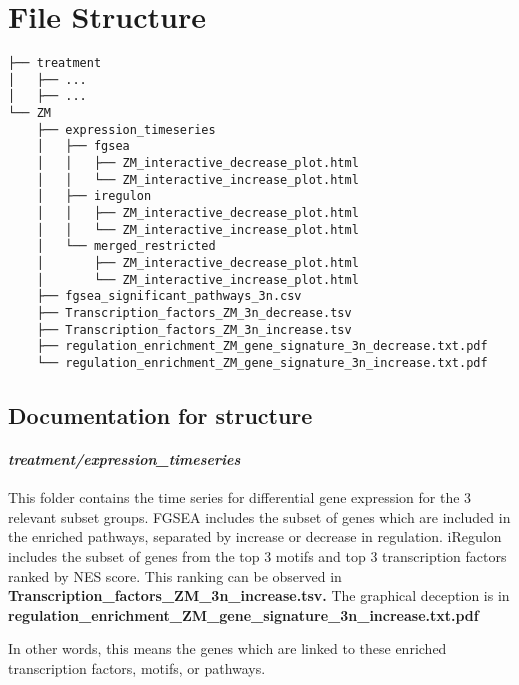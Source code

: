 \documentclass[
]{article}
\author{}
\date{\vspace{-2.5em}}
\begin{document}
\hypertarget{file-structure}{%
\section{File Structure}\label{file-structure}}

\begin{verbatim}
├── treatment
│   ├── ... 
│   ├── ... 
└── ZM
    ├── expression_timeseries
    │   ├── fgsea
    │   │   ├── ZM_interactive_decrease_plot.html
    │   │   └── ZM_interactive_increase_plot.html
    │   ├── iregulon
    │   │   ├── ZM_interactive_decrease_plot.html
    │   │   └── ZM_interactive_increase_plot.html
    │   └── merged_restricted
    │       ├── ZM_interactive_decrease_plot.html
    │       └── ZM_interactive_increase_plot.html
    ├── fgsea_significant_pathways_3n.csv
    ├── Transcription_factors_ZM_3n_decrease.tsv
    ├── Transcription_factors_ZM_3n_increase.tsv
    ├── regulation_enrichment_ZM_gene_signature_3n_decrease.txt.pdf
    └── regulation_enrichment_ZM_gene_signature_3n_increase.txt.pdf
\end{verbatim}

\hypertarget{documentation-for-structure}{%
\subsection{Documentation for
structure}\label{documentation-for-structure}}

\hypertarget{treatmentexpression_timeseries}{%
\paragraph{\texorpdfstring{\emph{\emph{treatment}/expression\_timeseries}}{treatment/expression\_timeseries}}\label{treatmentexpression_timeseries}}

This folder contains the time series for differential gene expression
for the 3 relevant subset groups. FGSEA includes the subset of genes
which are included in the enriched pathways, separated by increase or
decrease in regulation. iRegulon includes the subset of genes from the
top 3 motifs and top 3 transcription factors ranked by NES score. This
ranking can be observed in
\textbf{Transcription\_factors\_ZM\_3n\_increase.tsv.} The graphical
deception is in
\textbf{regulation\_enrichment\_ZM\_gene\_signature\_3n\_increase.txt.pdf}

In other words, this means the genes which are linked to these enriched
transcription factors, motifs, or pathways.
\end{document}
